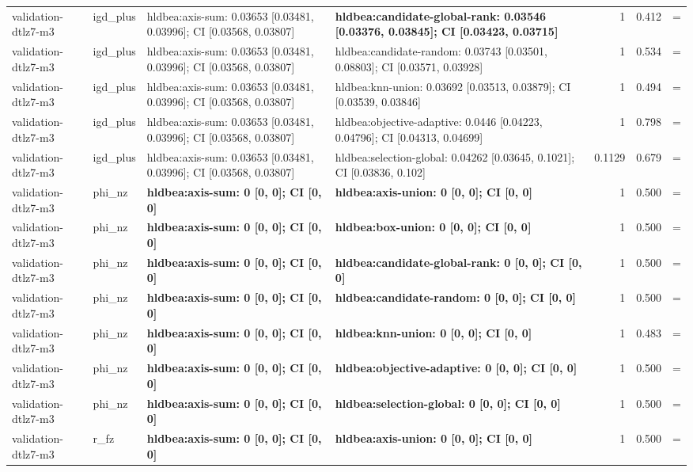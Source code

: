 \begin{tabular}{llllrrc}
validation-dtlz7-m3 & igd\_plus & hldbea:axis-sum: 0.03653 [0.03481, 0.03996]; CI [0.03568, 0.03807] & \textbf{hldbea:candidate-global-rank: 0.03546 [0.03376, 0.03845]; CI [0.03423, 0.03715]} & 1 & 0.412 & = \\
validation-dtlz7-m3 & igd\_plus & hldbea:axis-sum: 0.03653 [0.03481, 0.03996]; CI [0.03568, 0.03807] & hldbea:candidate-random: 0.03743 [0.03501, 0.08803]; CI [0.03571, 0.03928] & 1 & 0.534 & = \\
validation-dtlz7-m3 & igd\_plus & hldbea:axis-sum: 0.03653 [0.03481, 0.03996]; CI [0.03568, 0.03807] & hldbea:knn-union: 0.03692 [0.03513, 0.03879]; CI [0.03539, 0.03846] & 1 & 0.494 & = \\
validation-dtlz7-m3 & igd\_plus & hldbea:axis-sum: 0.03653 [0.03481, 0.03996]; CI [0.03568, 0.03807] & hldbea:objective-adaptive: 0.0446 [0.04223, 0.04796]; CI [0.04313, 0.04699] & 1 & 0.798 & = \\
validation-dtlz7-m3 & igd\_plus & hldbea:axis-sum: 0.03653 [0.03481, 0.03996]; CI [0.03568, 0.03807] & hldbea:selection-global: 0.04262 [0.03645, 0.1021]; CI [0.03836, 0.102] & 0.1129 & 0.679 & = \\
validation-dtlz7-m3 & phi\_nz & \textbf{hldbea:axis-sum: 0 [0, 0]; CI [0, 0]} & \textbf{hldbea:axis-union: 0 [0, 0]; CI [0, 0]} & 1 & 0.500 & = \\
validation-dtlz7-m3 & phi\_nz & \textbf{hldbea:axis-sum: 0 [0, 0]; CI [0, 0]} & \textbf{hldbea:box-union: 0 [0, 0]; CI [0, 0]} & 1 & 0.500 & = \\
validation-dtlz7-m3 & phi\_nz & \textbf{hldbea:axis-sum: 0 [0, 0]; CI [0, 0]} & \textbf{hldbea:candidate-global-rank: 0 [0, 0]; CI [0, 0]} & 1 & 0.500 & = \\
validation-dtlz7-m3 & phi\_nz & \textbf{hldbea:axis-sum: 0 [0, 0]; CI [0, 0]} & \textbf{hldbea:candidate-random: 0 [0, 0]; CI [0, 0]} & 1 & 0.500 & = \\
validation-dtlz7-m3 & phi\_nz & \textbf{hldbea:axis-sum: 0 [0, 0]; CI [0, 0]} & \textbf{hldbea:knn-union: 0 [0, 0]; CI [0, 0]} & 1 & 0.483 & = \\
validation-dtlz7-m3 & phi\_nz & \textbf{hldbea:axis-sum: 0 [0, 0]; CI [0, 0]} & \textbf{hldbea:objective-adaptive: 0 [0, 0]; CI [0, 0]} & 1 & 0.500 & = \\
validation-dtlz7-m3 & phi\_nz & \textbf{hldbea:axis-sum: 0 [0, 0]; CI [0, 0]} & \textbf{hldbea:selection-global: 0 [0, 0]; CI [0, 0]} & 1 & 0.500 & = \\
validation-dtlz7-m3 & r\_fz & \textbf{hldbea:axis-sum: 0 [0, 0]; CI [0, 0]} & \textbf{hldbea:axis-union: 0 [0, 0]; CI [0, 0]} & 1 & 0.500 & = \\

\end{tabular}
